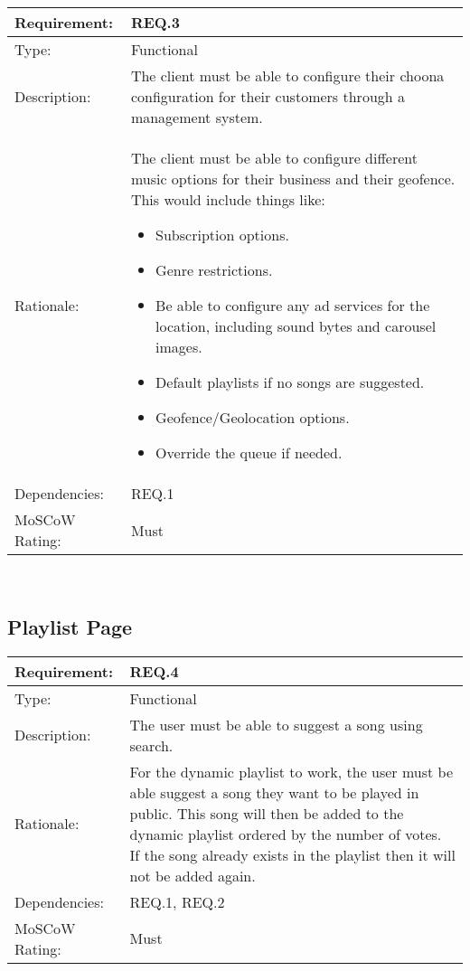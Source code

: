 \noindent
\begin{tabular}{|l || p{12.0cm}|}
  \hline
  Requirement:       & REQ.3 \\ \hline
  Type:              & Functional \\ \hline
  Description:       & The client must be able to configure their choona configuration for their customers through a management system. \\ \hline
  Rationale:         & The client must be able to configure different music options for their business and their geofence. This would include things like:
  \begin{itemize}
  \item Subscription options.
  \item Genre restrictions.
  \item Be able to configure any ad services for the location, including sound bytes and carousel images.
  \item Default playlists if no songs are suggested.
  \item Geofence/Geolocation options.
  \item Override the queue if needed.
  \end{itemize}
 \\ \hline
  Dependencies:      & REQ.1 \\ \hline
  MoSCoW Rating:     & Must \\
\hline
\end{tabular}\\

\vspace{0.5cm}
\subsection*{Playlist Page}

\noindent
\begin{tabular}{|l || p{12.0cm}|}
  \hline
  Requirement:       & REQ.4 \\ \hline
  Type:              & Functional \\ \hline
  Description:       & The user must be able to suggest a song using search. \\ \hline
  Rationale:         & For the dynamic playlist to work, the user must be able suggest a song they want to be played in public. This song will then be added to the dynamic playlist ordered by the number of votes. If the song already exists in the playlist then it will not be added again. \\ \hline
  Dependencies:      & REQ.1, REQ.2 \\ \hline
  MoSCoW Rating:     & Must \\
\hline
\end{tabular}\\

